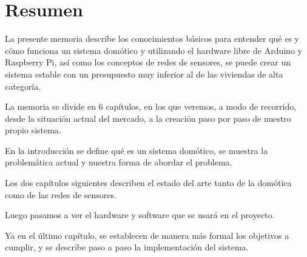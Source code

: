  
 \chapter*{Resumen}
 
 La presente memoria describe los conocimientos básicos para entender qué es y cómo funciona un sistema domótico y  utilizando el hardware libre de Arduino  y Raspberry Pi, así como los conceptos de redes de sensores, se puede crear un sistema estable con un presupuesto muy inferior al de las viviendas de alta categoría.
 
 La memoria se divide en 6 capítulos, en los que veremos, a modo de recorrido, desde la situación actual del mercado, a la creación paso por paso de nuestro propio sistema.
 
 En la introducción se define qué es un sistema domótico,  se muestra la problemática actual y nuestra forma de abordar el problema.
 
 Los dos capítulos siguientes describen el estado del arte tanto de la domótica como de las redes de sensores. 
 
 Luego pasamos a ver el hardware y software que se usará en el proyecto.
 
 Ya en el último capítulo, se establecen de manera más formal los objetivos a cumplir, y se describe paso a paso la implementación del sistema.